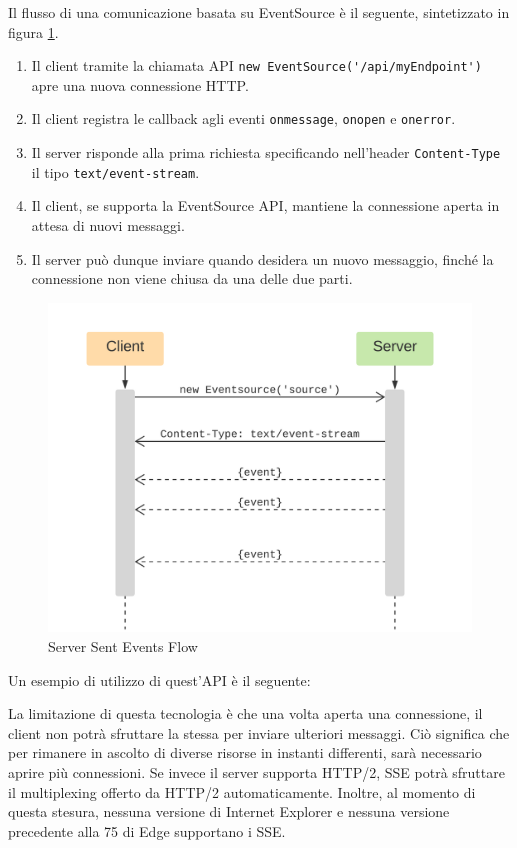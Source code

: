 \documentclass[12pt,a4paper,openright,twoside]{report}
\begin{document}
Il flusso di una comunicazione basata su EventSource è il seguente\cite{eventsource_api}, sintetizzato in figura \ref{fig:server_sent_events}.

\begin{enumerate}
  \item Il client tramite la chiamata API \lstinline{new EventSource('/api/myEndpoint')} apre una nuova connessione HTTP.
  \item Il client registra le callback agli eventi \lstinline{onmessage}, \lstinline{onopen} e \lstinline{onerror}.
  \item Il server risponde alla prima richiesta specificando nell'header \lstinline{Content-Type} il tipo \lstinline{text/event-stream}.
  \item Il client, se supporta la EventSource API, mantiene la connessione aperta in attesa di nuovi messaggi.
  \item Il server può dunque inviare quando desidera un nuovo messaggio, finché la connessione non viene chiusa da una delle due parti.
\end{enumerate}

\begin{figure}[!htbp]
\centering
\includegraphics[width=.6\textwidth]{assets/server_sent_events.png}
\caption{Server Sent Events Flow}
\label{fig:server_sent_events}
\end{figure}

Un esempio di utilizzo di quest'API è il seguente:


La limitazione di questa tecnologia è che una volta aperta una connessione, il client non potrà sfruttare la stessa per inviare ulteriori messaggi. Ciò significa che per rimanere in ascolto di diverse risorse in instanti differenti, sarà necessario aprire più connessioni. Se invece il server supporta HTTP/2, SSE potrà sfruttare il multiplexing offerto da HTTP/2 automaticamente.
Inoltre, al momento di questa stesura, nessuna versione di Internet Explorer e nessuna versione precedente alla 75 di Edge supportano i SSE\cite{sse_support_caniuse}.
\end{document}
